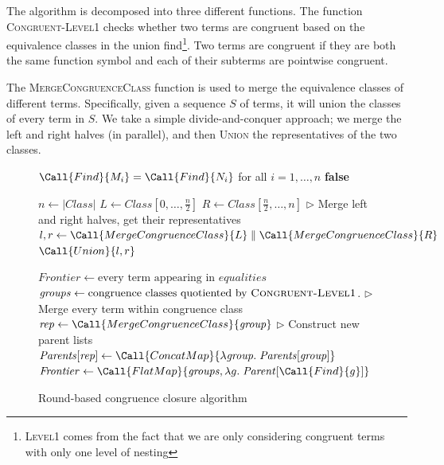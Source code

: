 The algorithm is decomposed into three different functions. The function
\textsc{Congruent-Level1} checks whether two terms are congruent based on the
equivalence classes in the union find\footnote{\textsc{Level1} comes from the
fact that we are only considering congruent terms with only one level of
nesting}. Two terms are congruent if they are both the same function symbol and
each of their subterms are pointwise congruent.

The \textsc{MergeCongruenceClass} function is used to merge the equivalence
classes of different terms. Specifically, given a sequence $S$ of terms, it will
union the classes of every term in $S$. We take a simple divide-and-conquer
approach; we merge the left and right halves (in parallel), and then
\textsc{Union} the representatives of the two classes.

\begin{figure}
  \centering
\begin{algorithmic}[1]
      \State \Return $\Call{Find}{M_i} = \Call{Find}{N_i}$
      for all $i = 1,\ldots,n$ \Else \State \Return \textbf{false} \EndIf
      \EndFunction

      \State {}  \EndIf \State $n \gets |\textit{Class}|$ \State $L \gets
      \mathit{Class}[0,\ldots,\frac{n}{2}]$ \State $R \gets
      \mathit{Class}[\frac{n}{2},\ldots,n]$ \State $\rhd$ Merge left and right
      halves, get their representatives \State $l, r \gets
      \Call{MergeCongruenceClass}{L} \parallel \Call{MergeCongruenceClass}{R}$
      \State \Return $\Call{Union}{l, r}$  \EndFunction

        \State $\mathit{Frontier} \gets \text{every term appearing in } \mathit{equalities}$
          \State $\mathit{groups} \gets \text{congruence classes quotiented by } \textsc{Congruent-Level1}$.
            \State $\rhd$ Merge every term within congruence class
            \State $\mathit{rep} \gets \Call{MergeCongruenceClass}{\mathit{group}}$
            \State $\rhd$ Construct new parent lists
            \State $\mathit{Parents}[\mathit{rep}] \gets \Call{ConcatMap}{\lambda \mathit{group}. \; \mathit{Parents}[\mathit{group}]}$
          \EndParFor
          \State $\mathit{Frontier} \gets \Call{FlatMap}{\mathit{groups}, \lambda g. \; \mathit{Parent}[\Call{Find}{g}] }$
        \EndWhile
    \EndFunction
\end{algorithmic}

\caption{Round-based congruence closure algorithm}
\label{fig:alg:bsp}
\end{figure}
